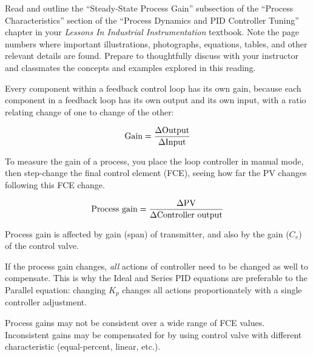 

Read and outline the ``Steady-State Process Gain'' subsection of the ``Process Characteristics'' section of the ``Process Dynamics and PID Controller Tuning'' chapter in your {\it Lessons In Industrial Instrumentation} textbook.  Note the page numbers where important illustrations, photographs, equations, tables, and other relevant details are found.  Prepare to thoughtfully discuss with your instructor and classmates the concepts and examples explored in this reading.














Every component within a feedback control loop has its own gain, because each component in a feedback loop has its own output and its own input, with a ratio relating change of one to change of the other:

$$\hbox{Gain} = {\Delta \hbox{Output} \over \Delta \hbox{Input}}$$

\vskip 10pt

To measure the gain of a process, you place the loop controller in manual mode, then step-change the final control element (FCE), seeing how far the PV changes following this FCE change.

$$\hbox{Process gain} = {\Delta \hbox{PV} \over \Delta \hbox{Controller output}}$$

Process gain is affected by gain (span) of transmitter, and also by the gain ($C_v$) of the control valve.

\vskip 10pt

If the process gain changes, {\it all} actions of controller need to be changed as well to compensate.  This is why the Ideal and Series PID equations are preferable to the Parallel equation: changing $K_p$ changes all actions proportionately with a single controller adjustment.

\vskip 10pt

Process gains may not be consistent over a wide range of FCE values.  Inconsistent gains may be compensated for by using control valve with different characteristic (equal-percent, linear, etc.).








